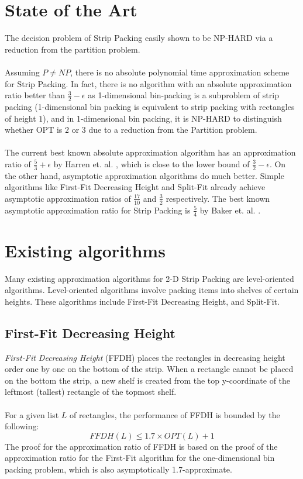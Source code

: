 \documentclass{article}
\begin{document}
\section{State of the Art}
The decision problem of Strip Packing easily shown to be NP-HARD via a reduction from the partition problem.\\
\\
Assuming $P \neq NP$, there is no absolute polynomial time approximation scheme for Strip Packing. In fact, there is no algorithm with an absolute approximation ratio better than $\frac{3}{2} - \epsilon$ as 1-dimensional bin-packing is a subproblem of strip packing (1-dimensional bin packing is equivalent to strip packing with rectangles of height $1$), and in 1-dimensional bin packing, it is NP-HARD to distinguish whether OPT is $2$ or $3$ due to a reduction from the Partition problem.\\
\\
The current best known absolute approximation algorithm has an approximation ratio of $\frac{5}{3} + \epsilon$ by Harren et. al. \cite{harren1}, which is close to the lower bound of $\frac{3}{2} - \epsilon$. On the other hand, asymptotic approximation algorithms do much better. Simple algorithms like First-Fit Decreasing Height and Split-Fit already achieve asymptotic approximation ratios of $\frac{17}{10}$ and $\frac{3}{2}$ respectively. The best known asymptotic approximation ratio for Strip Packing is $\frac{5}{4}$ by Baker et. al.  \cite{baker1}.\\

\section{Existing algorithms}
Many existing approximation algorithms for 2-D Strip Packing are level-oriented algorithms. Level-oriented algorithms involve packing items into shelves of certain heights. These algorithms include First-Fit Decreasing Height, and Split-Fit.
\subsection{First-Fit Decreasing Height}
\textit{First-Fit Decreasing Height} (FFDH) places the rectangles in decreasing height order one by one on the bottom of the strip. When a rectangle cannot be placed on the bottom the strip, a new shelf is created from the top y-coordinate of the leftmost (tallest) rectangle of the topmost shelf.\\
\\
For a given list $L$ of rectangles, the performance of FFDH is bounded by the following:
\[
	FFDH(L) \leq 1.7 \times OPT(L) + 1
\]
The proof for the approximation ratio of FFDH is based on the proof of the approximation ratio for the First-Fit algorithm for the one-dimensional bin packing problem, which is also asymptotically 1.7-approximate.
\end{document}
